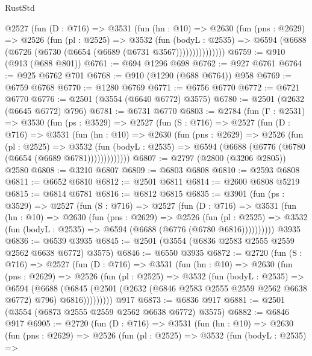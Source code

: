 \begin{lexlean}{RustStd}
\begin{coremodule}
          @2527
            (fun (D : @716) =>
            @3531
              (fun (hn : @10) =>
              @2630
                (fun (pns : @2629) =>
                @2526
                  (fun (pl : @2525) =>
                  @3532
                    (fun (bodyL : @2535) =>
                    @6594 (@6688 (@6726 (@6730 (@6654 (@6689 (@6731 @3567)))))))))))))))
@6759 := @910 (@913 (@688 @801))
@6761 := @694 @1296 @698
@6762 := @927 @6761
@6764 := @925 @6762 @701
@6768 := @910 (@1290 (@688 @6764)) @958
@6769 := @6759 @6768
@6770 := @1280 @6769
@6771 := @6756 @6770
@6772 := @6721 @6770
@6776 := @2501 (@3554 (@6640 @6772) @3575)
@6780 := @2501 (@2632 (@6645 @6772) @796)
@6781 := @6731 @6770
@6803 := @2784
    (fun (Γ : @2531) =>
    @3530
      (fun (ps : @3529) =>
      @2527
        (fun (S : @716) =>
        @2527
          (fun (D : @716) =>
          @3531
            (fun (hn : @10) =>
            @2630
              (fun (pns : @2629) =>
              @2526
                (fun (pl : @2525) =>
                @3532
                  (fun (bodyL : @2535) =>
                  @6594 (@6688 (@6776 (@6780 (@6654 (@6689 @6781)))))))))))))
@6807 := @2797 (@2800 (@3206 @2805)) @2580
@6808 := @3210 @6807
@6809 := @6803 @6808
@6810 := @2593 @6808
@6811 := @6652 @6810
@6812 := @2501 @6811
@6814 := @2600 @6808 @5219
@6815 := @6814 @6781
@6816 := @6812 @6815
@6835 := @3901
    (fun (ps : @3529) =>
    @2527
      (fun (S : @716) =>
      @2527
        (fun (D : @716) =>
        @3531
          (fun (hn : @10) =>
          @2630
            (fun (pns : @2629) =>
            @2526
              (fun (pl : @2525) =>
              @3532 (fun (bodyL : @2535) => @6594 (@6688 (@6776 (@6780 @6816))))))))))
    @3935
@6836 := @6539 @3935
@6845 := @2501 (@3554 (@6836 @2583 @2555 @2559 @2562 @6638 @6772) @3575)
@6846 := @6550 @3935
@6872 := @2720
    (fun (S : @716) =>
    @2527
      (fun (D : @716) =>
      @3531
        (fun (hn : @10) =>
        @2630
          (fun (pns : @2629) =>
          @2526
            (fun (pl : @2525) =>
            @3532
              (fun (bodyL : @2535) =>
              @6594
                (@6688
                  (@6845
                    (@2501 (@2632 (@6846 @2583 @2555 @2559 @2562 @6638 @6772) @796) @6816)))))))))
    @917
@6873 := @6836 @917
@6881 := @2501 (@3554 (@6873 @2555 @2559 @2562 @6638 @6772) @3575)
@6882 := @6846 @917
@6905 := @2720
    (fun (D : @716) =>
    @3531
      (fun (hn : @10) =>
      @2630
        (fun (pns : @2629) =>
        @2526
          (fun (pl : @2525) =>
          @3532
            (fun (bodyL : @2535) =>

\end{coremodule}
\end{lexlean}
